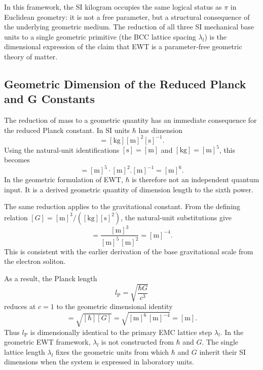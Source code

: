 \documentclass[10pt,a4paper]{article}
\begin{document}
In this framework, the SI kilogram occupies the same logical
status as $\pi$ in Euclidean geometry: it is not a free
parameter, but a structural consequence of the underlying
geometric medium.  The reduction of all three SI mechanical
base units to a single geometric primitive (the BCC lattice
spacing $\lambda_l$) is the dimensional expression of the
claim that EWT is a parameter‑free geometric theory of matter.


\subsection{Geometric Dimension of the Reduced Planck and G Constants}
\label{sec:hbar_geometric_dimension}

The reduction of mass to a geometric quantity has an immediate
consequence for the reduced Planck constant. In SI units
\(\hbar\) has dimension
\begin{equation}
	[\hbar]
	=
	[\mathrm{kg}][\mathrm{m}]^{2}[\mathrm{s}]^{-1}
	.
\end{equation}
Using the natural-unit identifications
\([\mathrm{s}]=[\mathrm{m}]\) and
\([\mathrm{kg}]=[\mathrm{m}]^{5}\),
this becomes
\begin{equation}
	[\hbar]
	=
	[\mathrm{m}]^{5}
	\cdot
	[\mathrm{m}]^{2}
	.
	[\mathrm{m}]^{-1}
	=
	[\mathrm{m}]^{6}
	.
	\label{eq:hbar_dimension}
\end{equation}
In the geometric formulation of EWT, \(\hbar\) is therefore not an
independent quantum input. It is a derived geometric quantity of
dimension length to the sixth power.

The same reduction applies to the gravitational constant.
From the defining relation
\([G]=[\mathrm{m}]^{3}/([\mathrm{kg}][\mathrm{s}]^{2})\),
the natural-unit substitutions give
\begin{equation}
	[G]
	=
	\frac{[\mathrm{m}]^{3}}
	{[\mathrm{m}]^{5}\,[\mathrm{m}]^{2}}
	=
	[\mathrm{m}]^{-4}
	.
	\label{eq:G_dimension}
\end{equation}
This is consistent with the earlier derivation of the base
gravitational scale from the electron soliton.

As a result, the Planck length
\begin{equation}
	l_{\mathrm{P}}
	=
	\sqrt{\frac{\hbar G}{c^{3}}}
	\label{eq:planck_length_definition}
\end{equation}
reduces at \(c=1\) to the geometric dimensional identity
\begin{equation}
	[l_{\mathrm{P}}]
	=
	\sqrt{[\hbar][G]}
	=
	\sqrt{[\mathrm{m}]^{6}\,[\mathrm{m}]^{-4}}
	=
	[\mathrm{m}]
	.
	\label{eq:planck_length_geometric}
\end{equation}
Thus \(l_{\mathrm{P}}\) is dimensionally identical to the primary EMC lattice
step \(\lambda_l\). In the geometric EWT framework, \(\lambda_l\) is
not constructed from \(\hbar\) and \(G\). The single lattice length
\(\lambda_l\) fixes the geometric units from which \(\hbar\) and \(G\)
inherit their SI dimensions when the system is expressed in
laboratory units.
\end{document}
